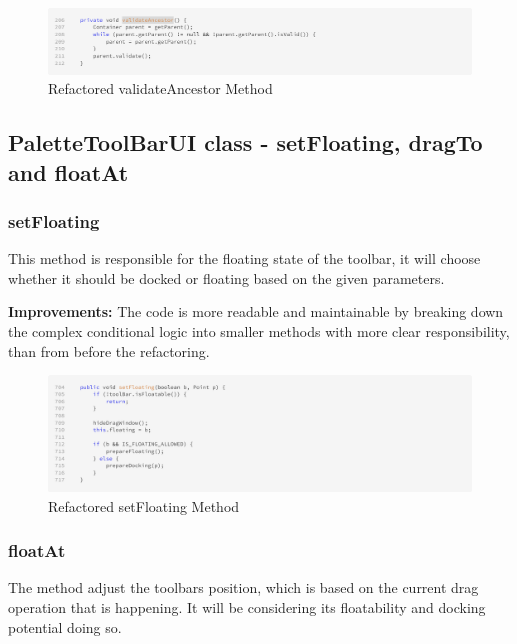 \begin{figure}[H]
    \centering
    \includegraphics[width=\linewidth]{pic/F validateAncestor.png}
    \caption{Refactored validateAncestor Method}
    \label{fig:Refactored validateAncestor Method}
\end{figure}






\subsection{PaletteToolBarUI class - setFloating, dragTo and floatAt}





\subsubsection{setFloating}
This method is responsible for the floating state of the toolbar, it will choose whether it should be docked or floating based on the given parameters.

\textbf{Improvements:} The code is more readable and maintainable by breaking down the complex conditional logic into smaller methods with more clear responsibility,
than from before the refactoring.

\begin{figure}[H]
    \centering
    \includegraphics[width=\linewidth]{pic/F setFloating.png}
    \caption{Refactored setFloating Method}
    \label{fig:Refactored setFloating Method}
\end{figure}







\subsubsection{floatAt}
The method adjust the toolbars position, which is based on the current drag operation that is happening. It will be considering its floatability and docking potential doing so.

